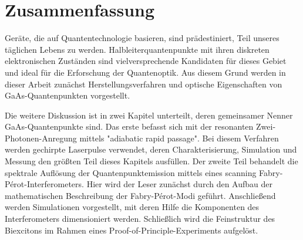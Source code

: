 
\chapter*{Zusammenfassung}
\label{cha:zusammenfassung}


Geräte, die auf Quantentechnologie basieren, sind prädestiniert, Teil unseres täglichen Lebens zu werden.
Halbleiterquantenpunkte mit ihren diskreten elektronischen Zuständen sind vielversprechende Kandidaten für dieses Gebiet und ideal für die Erforschung der Quantenoptik.
Aus diesem Grund werden in dieser Arbeit zunächst Herstellungsverfahren und optische Eigenschaften von GaAs-Quantenpunkten vorgestellt.

Die weitere Diskussion ist in zwei Kapitel unterteilt, deren gemeinsamer Nenner GaAs-Quantenpunkte sind.
Das erste befasst sich mit der resonanten Zwei-Photonen-Anregung mittels "adiabatic rapid passage".
Bei diesem Verfahren werden gechirpte Laserpulse verwendet, deren Charakterisierung, Simulation und Messung den größten Teil dieses Kapitels ausfüllen.
Der zweite Teil behandelt die spektrale Auflösung der Quantenpunktemission mittels eines scanning Fabry-Pérot-Interferometers.
Hier wird der Leser zunächst durch den Aufbau der mathematischen Beschreibung der Fabry-Pérot-Modi geführt.
Anschließend werden Simulationen vorgestellt, mit deren Hilfe die Komponenten des Interferometers dimensioniert werden.
Schließlich wird die Feinstruktur des Biexcitons im Rahmen eines Proof-of-Principle-Experiments aufgelöst.

